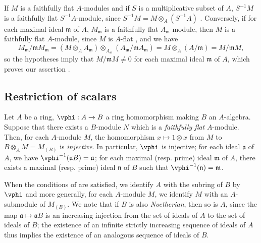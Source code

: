 \begin{env}[6.4.5]
\label{0.6.4.5}
If $M$ is a faithfully flat $A$-modules and if $S$ is a multiplicative subset of $A$,
$S^{-1}M$ is a faithfully flat $S^{-1}A$-module, since $S^{-1}M=M\otimes_A(S^{-1}A)$
. Conversely, if for each maximal ideal $\mathfrak{m}$ of $A$,
$M_\mathfrak{m}$ is a faithfully flat $A_\mathfrak{m}$-module, then $M$ is a faithfully flat
$A$-module, since $M$ is $A$-flat , and we have
\[
  M_\mathfrak{m}/\mathfrak{m}M_\mathfrak{m}
  =(M\otimes_A A_\mathfrak{m})
  \otimes_{A_\mathfrak{m}}(A_\mathfrak{m}/\mathfrak{m}A_\mathfrak{m})
  =M\otimes_A(A/\mathfrak{m})=M/\mathfrak{m}M,
\]
so the hypotheses imply that $M/\mathfrak{m}M\neq 0$ for each maximal ideal $\mathfrak{m}$ of
$A$, which proves our assertion .
\end{env}

\subsection{Restriction of scalars}
\label{subsection:0.6.5}

\begin{env}[6.5.1]
\label{0.6.5.1}
Let $A$ be a ring, $\vphi:A\to B$ a ring homomorphism making $B$ an $A$-algebra. Suppose that
there exists a $B$-module $N$ which is a \emph{faithfully flat} $A$-module. Then, for each
$A$-module $M$, the homomorphism $x\mapsto 1\otimes x$ from $M$ to $B\otimes_A M=M_{(B)}$ is
\emph{injective}. In particular, $\vphi$ is injective; for each ideal $\mathfrak{a}$ of $A$,
we have $\vphi^{-1}(\mathfrak{a}B)=\mathfrak{a}$; for each maximal (resp. prime) ideal
$\mathfrak{m}$ of $A$, there exists a maximal (resp. prime) ideal $\mathfrak{n}$ of $B$ such
that $\vphi^{-1}(\mathfrak{n})=\mathfrak{m}$.
\end{env}

\begin{env}[6.5.2]
\label{0.6.5.2}
When the conditions of  are satisfied, we identify $A$ with the subring of
$B$ by $\vphi$ and more generally, for each $A$-module $M$, we identify $M$ with an
$A$-submodule of $M_{(B)}$. We note that if $B$ is also \emph{Noetherian}, then so is $A$,
since the map $\mathfrak{a}\mapsto\mathfrak{a}B$ is an increasing injection from the set of
ideals of $A$ to the set of ideals of $B$; the existence of an infinite strictly increasing
sequence of ideals of $A$ thus implies the existence of an analogous sequence of ideals of
$B$.
\end{env}

